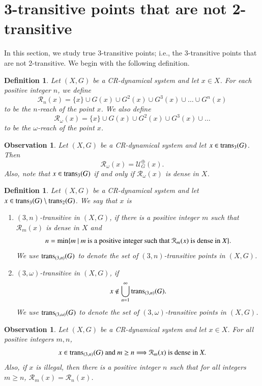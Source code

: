 \documentclass[a4paper,12pt]{article} %
\newcommand{\orbitt}{\mathcal{U}^{\oplus}}
\newcommand{\trans}{\textup{trans}}
\newtheorem{definition}[theorem]{Definition}
\newtheorem{observation}[theorem]{Observation}
\begin{document}
\section{3-transitive points that are not 2-transitive} \label{s2}
In this section, we study true 3-transitive points; i.e., the 3-transitive points that are not 2-transitive.  We begin with the following definition. 
\begin{definition}
Let $(X,G)$ be a CR-dynamical system and let $x\in X$.  For each positive integer $n$, we define 
$$
\mathcal R_n(x)=\{x\}\cup G(x)\cup G^{2}(x)\cup G^{3}(x)\cup \ldots \cup G^n(x)
$$
to be \emph{\color{blue} the $n$-reach of the point $x$}.  We also define
$$
\mathcal R_{\omega}(x)=\{x\}\cup G(x)\cup G^{2}(x)\cup G^{3}(x)\cup \ldots
$$
to  be \emph{\color{blue} the $\omega$-reach of the point $x$}.  
\end{definition}
\begin{observation}
Let $(X,G)$ be a CR-dynamical system and let $x\in \trans_3(G)$.  Then 
$$
\mathcal R_{\omega}(x)=\orbitt_G(x).
$$
Also, note that $x\in \trans_3(G)$ if and only if $\mathcal R_{\omega}(x)$ is dense in $X$.
\end{observation}
\begin{definition}\label{666}
Let $(X,G)$ be a CR-dynamical system and let $x\in \trans_3(G)\setminus \trans_2(G)$.  We say that $x$ is 
\begin{enumerate}
\item \emph{\color{blue}  $(3,n)$-transitive in $(X,G)$}, if there is a positive integer $m$ such that $\mathcal R_m(x)$ is dense in $X$ and 
$$
n=\min\{m \ | \ m \textup{ is a positive integer such that } \mathcal R_m(x) \textup{ is dense in } X\}.
$$
  We use \emph{\color{blue}  $\trans_{(3,n)}(G)$} to denote the set of  $(3,n)$-transitive points in $(X,G)$.
  \item \emph{\color{blue} $(3,\omega)$-transitive in $(X,G)$}, if 
  $$
  x\not \in \bigcup_{n=1}^{\infty}\trans_{(3,n)}(G).
  $$
  We use \emph{\color{blue}  $\trans_{(3,\omega)}(G)$} to denote the set of  $(3,\omega)$-transitive points in $(X,G)$.
\end{enumerate} 
\end{definition}
\begin{observation}
Let $(X,G)$ be a CR-dynamical system and let $x\in X$.  For all positive integers $m,n$,
$$
x\in \trans_{(3,n)}(G) \textup{ and } m\geq n \Longrightarrow  \mathcal R_m(x) \textup{ is dense in } X. 
$$
Also, if $x$ is illegal, then there is a positive integer $n$ such that for all integers $m\geq n$, $\mathcal R_m(x) =\mathcal R_n(x)$.
\end{observation}
\end{document}
